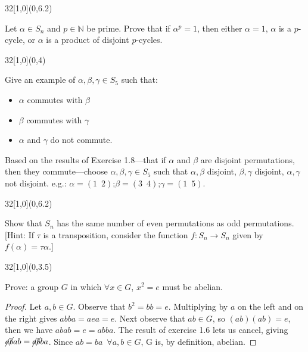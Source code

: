 \documentclass[12pt]{article}
\newenvironment{exercise}[2]{\begin{textblock}{32}[1,0](0,#2)\noindent#1\end{textblock}}{\vspace{1in}}
\begin{document}
\begin{exercise}{1.16}{6.2}
	{\noindent}Let $\alpha\in S_n$ and $p\in \mathbb{N}$ be prime. Prove that if $\alpha^p=1$,
	then either $\alpha=1$, $\alpha$ is a $p$-cycle, or $\alpha$ is a product of disjoint $p$-cycles.
	\bigskip

\end{exercise}

\begin{exercise}{1.18}{4}
	{\noindent}Give an example of $\alpha, \beta, \gamma\in S_5$ such that:
	\begin{itemize}
		\item $\alpha$ commutes with $\beta$
		\item $\beta$ commutes with $\gamma$
		\item $\alpha$ and $\gamma$ do not commute.
	\end{itemize}
	\bigskip
	Based on the results of Exercise 1.8---that if $\alpha$ and $\beta$ are disjoint permutations,
	then they commute---choose $\alpha, \beta, \gamma\in S_5$ such that $\alpha, \beta$ disjoint,
	$\beta, \gamma$ disjoint, $\alpha, \gamma$ not disjoint. e.g.:
	$\alpha = (1\enspace2)$;\quad $\beta = (3\enspace4)$;\quad $\gamma = (1\enspace5)$.
\end{exercise}

\begin{exercise}{1.21}{6.2}
  {\noindent}Show that $S_n$ has the same number of even permutations as odd permutations.
	[Hint: If $\tau$ is a transposition, consider the function $f : S_n\to S_n$ given by $f(\alpha)=\tau\alpha$.]
	\bigskip

\end{exercise}


\begin{exercise}{1.26}{3.5}
	{\noindent}Prove: a group $G$ in which $\forall x\in G$, $x^2=e$ must be abelian.
	\bigskip

	\begin{proof}
		Let $a, b\in G$. Observe that $b^2 = bb = e$. Multiplying by $a$ on the left and on the right gives
		$abba = aea = e$. Next observe that $ab\in G$, so $(ab)(ab) = e$, then we have $abab = e = abba$. The result of
		exercise 1.6 lets us cancel, giving $\cancel{a}\cancel{b}ab = \cancel{a}\cancel{b}ba$. Since $ab = ba\enspace
		\forall a, b \in G$, G is, by definition, abelian.
	\end{proof}
\end{exercise}

\newpage
\end{document}
